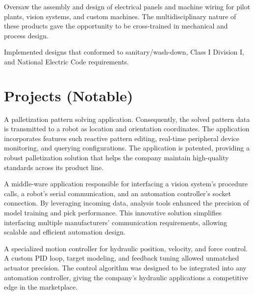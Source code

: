 \documentclass{TaylorTurnerResume2023}
\begin{document}
\begin{minipage}[t]{0.7\textwidth}
\begin{tightemize}
\sectionsep
\item Oversaw the assembly and design of electrical panels and machine wiring for pilot plants, vision systems, and custom machines. The multidisciplinary nature of these products gave the opportunity to be cross-trained in mechanical and process design. 
\item Implemented designs that conformed to sanitary/wash-down, Class I Division I, and National Electric Code requirements.              
\end{tightemize}
\sectionsep

\section{Projects \small{(Notable)}}

\begin{tightemize}
\item A palletization pattern solving application. Consequently, the solved pattern data is transmitted to a robot as location and orientation coordinates. The application incorporates features such reactive pattern editing, real-time peripheral device monitoring, and querying configurations. The application is patented, providing a robust palletization solution that helps the company maintain high-quality standards across its product line.
\end{tightemize}
\sectionsep

\begin{tightemize}
\item A middle-ware application responsible for interfacing a vision system's procedure calls, a robot's serial communication, and an automation controller's socket connection. By leveraging incoming data, analysis tools enhanced the precision of model training and pick performance. This innovative solution simplifies interfacing multiple manufacturers' communication requirements, allowing scalable and efficient automation design.
\end{tightemize}
\sectionsep

\begin{tightemize}
\item A specialized motion controller for hydraulic position, velocity, and force control. A custom PID loop, target modeling, and feedback tuning allowed unmatched actuator precision. The control algorithm was designed to be integrated into any automation controller, giving the company's hydraulic applications a competitive edge in the marketplace. 
\end{tightemize}
\sectionsep


\end{minipage} 
\end{document}
